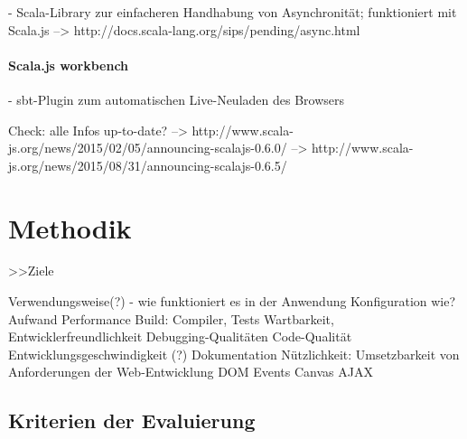 \documentclass[a4paper, 12pt, hidelinks, listof=totoc, listoftables=totoc, bibliography=totoc]{scrreprt}
\begin{document}
- Scala-Library zur einfacheren Handhabung von Asynchronität; funktioniert mit Scala.js -->  http://docs.scala-lang.org/sips/pending/async.html

\subsubsection{Scala.js workbench}

- sbt-Plugin zum automatischen Live-Neuladen des Browsers


Check: alle Infos up-to-date?
-->  http://www.scala-js.org/news/2015/02/05/announcing-scalajs-0.6.0/
-->  http://www.scala-js.org/news/2015/08/31/announcing-scalajs-0.6.5/





\chapter{Methodik}

>>Ziele

Verwendungsweise(?) - wie funktioniert es in der Anwendung
Konfiguration
	wie?
	Aufwand
Performance
	Build: Compiler, Tests
Wartbarkeit, Entwicklerfreundlichkeit
	Debugging-Qualitäten
	Code-Qualität
	Entwicklungsgeschwindigkeit (?)
	Dokumentation
Nützlichkeit: Umsetzbarkeit von Anforderungen der Web-Entwicklung
	DOM
	Events
	Canvas
	AJAX

\section{Kriterien der Evaluierung}
\end{document}
